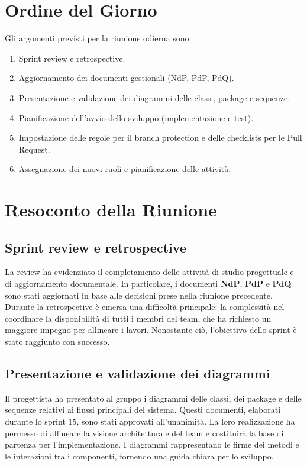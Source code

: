 \section{Ordine del Giorno}
Gli argomenti previsti per la riunione odierna sono:
\begin{enumerate}
	\item Sprint review e retrospective.
	\item Aggiornamento dei documenti gestionali (NdP, PdP, PdQ).
	\item Presentazione e validazione dei diagrammi delle classi, package e sequenze.
	\item Pianificazione dell'avvio dello sviluppo (implementazione e test).
	\item Impostazione delle regole per il branch protection e delle checklists per le Pull Request.
	\item Assegnazione dei nuovi ruoli e pianificazione delle attività.
\end{enumerate}

\section{Resoconto della Riunione}

\subsection{Sprint review e retrospective}
La review ha evidenziato il completamento delle attività di studio progettuale e di aggiornamento documentale. 
In particolare, i documenti \textbf{NdP}, \textbf{PdP} e \textbf{PdQ} sono stati aggiornati in base alle decisioni 
prese nella riunione precedente. 
Durante la retrospective è emersa una difficoltà principale: la complessità nel coordinare la disponibilità di tutti 
i membri del team, che ha richiesto un maggiore impegno per allineare i lavori. Nonostante ciò, l'obiettivo dello 
sprint è stato raggiunto con successo.

\subsection{Presentazione e validazione dei diagrammi}
Il progettista ha presentato al gruppo i diagrammi delle classi, dei package e delle sequenze relativi ai flussi 
principali del sistema. Questi documenti, elaborati durante lo sprint 15, sono stati approvati all'unanimità. 
La loro realizzazione ha permesso di allineare la visione architetturale del team e costituirà la base di partenza 
per l'implementazione. I diagrammi rappresentano le firme dei metodi e le interazioni tra i componenti, fornendo 
una guida chiara per lo sviluppo.

